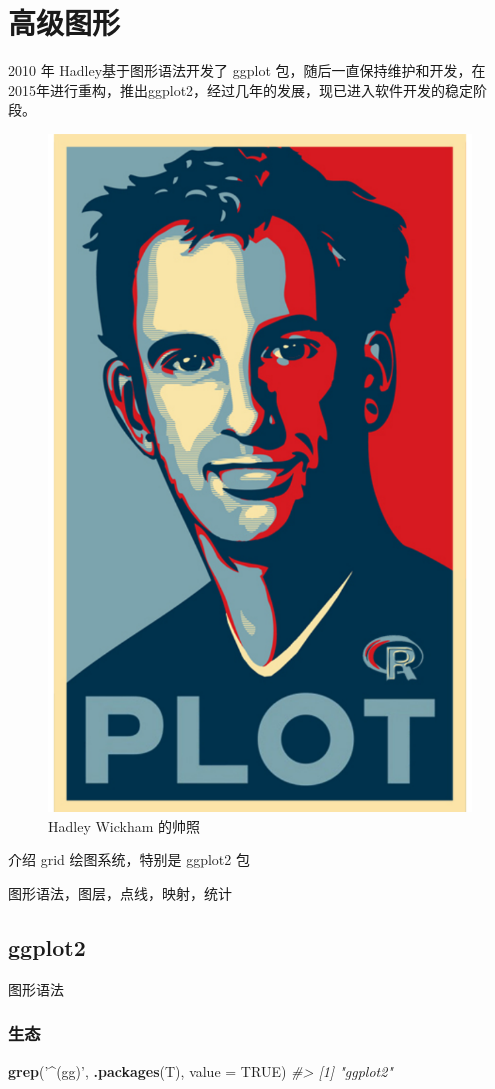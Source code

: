 \documentclass[a4paper,oneside,UTF8]{book}
\newenvironment{Shaded}{\begin{snugshade}}{\end{snugshade}}
\newcommand{\CommentTok}[1]{\textcolor[rgb]{0.56,0.35,0.01}{\textit{#1}}}
\newcommand{\DataTypeTok}[1]{\textcolor[rgb]{0.13,0.29,0.53}{#1}}
\newcommand{\KeywordTok}[1]{\textcolor[rgb]{0.13,0.29,0.53}{\textbf{#1}}}
\newcommand{\NormalTok}[1]{#1}
\newcommand{\OtherTok}[1]{\textcolor[rgb]{0.56,0.35,0.01}{#1}}
\newcommand{\StringTok}[1]{\textcolor[rgb]{0.31,0.60,0.02}{#1}}
\begin{document}
\hypertarget{Advanced-Graphics}{%
\chapter{高级图形}\label{Advanced-Graphics}}

2010 年 Hadley基于图形语法开发了 ggplot 包，随后一直保持维护和开发，在2015年进行重构，推出ggplot2，经过几年的发展，现已进入软件开发的稳定阶段。

\begin{figure}

{\centering \includegraphics[width=0.45\linewidth]{images/hadley} 

}

\caption{Hadley Wickham 的帅照}\label{fig:hadley-photo}
\end{figure}

介绍 grid 绘图系统，特别是 ggplot2 包

图形语法，图层，点线，映射，统计

\hypertarget{grammar-of-graphics}{%
\section{ggplot2}\label{grammar-of-graphics}}

图形语法

\hypertarget{eco}{%
\subsection{生态}\label{eco}}

\begin{Shaded}
\begin{Highlighting}[]
\KeywordTok{grep}\NormalTok{(}\StringTok{'^(gg)'}\NormalTok{, }\KeywordTok{.packages}\NormalTok{(T), }\DataTypeTok{value =} \OtherTok{TRUE}\NormalTok{)}
\CommentTok{#> [1] "ggplot2"}
\end{Highlighting}
\end{Shaded}
\end{document}
